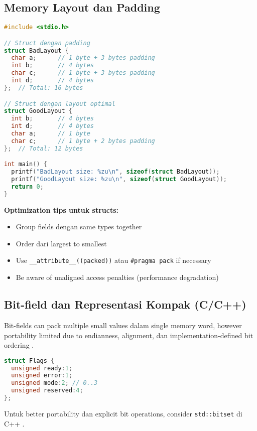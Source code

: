 \documentclass[../main.tex]{subfiles}
\begin{document}
\subsection{Memory Layout dan Padding}

\begin{lstlisting}[language=C, caption={Struct padding di C}]
#include <stdio.h>

// Struct dengan padding
struct BadLayout {
  char a;      // 1 byte + 3 bytes padding
  int b;       // 4 bytes
  char c;      // 1 byte + 3 bytes padding
  int d;       // 4 bytes
};  // Total: 16 bytes

// Struct dengan layout optimal
struct GoodLayout {
  int b;       // 4 bytes
  int d;       // 4 bytes
  char a;      // 1 byte
  char c;      // 1 byte + 2 bytes padding
};  // Total: 12 bytes

int main() {
  printf("BadLayout size: %zu\n", sizeof(struct BadLayout));
  printf("GoodLayout size: %zu\n", sizeof(struct GoodLayout));
  return 0;
}
\end{lstlisting}

\textbf{Optimization tips untuk structs:}
\begin{itemize}
  \item Group fields dengan same types together
  \item Order dari largest to smallest
  \item Use \texttt{\_\_attribute\_\_((packed))} atau \texttt{\#pragma pack} if necessary
  \item Be aware of unaligned access penalties (performance degradation)
\end{itemize}

\subsection{Bit-field dan Representasi Kompak (C/C++)}
Bit-fields can pack multiple small values dalam single memory word, however portability limited due to endianness, alignment, dan implementation-defined bit ordering \parencite{c-bitfield,cpp-bitfield}.

\begin{lstlisting}[language=C, caption={Bit-field untuk flags (C)}]
struct Flags {
  unsigned ready:1;
  unsigned error:1;
  unsigned mode:2; // 0..3
  unsigned reserved:4;
};
\end{lstlisting}

Untuk better portability dan explicit bit operations, consider \texttt{std::bitset} di C++ \parencite{cpp-bitset}.
\end{document}
